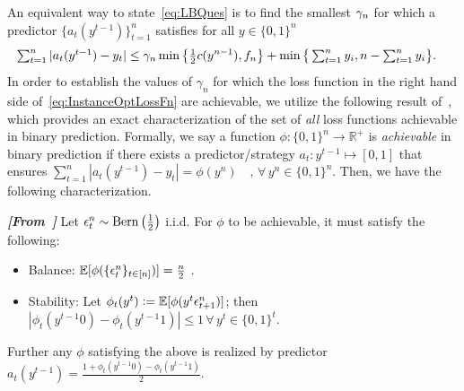 An equivalent way to state~\cref{eq:LBQues} is to find the smallest $\gamma_n$ for which a predictor $\{a_t(y^{t-1})\}_{t=1}^n$ satisfies for all $y\in\{0,1\}^n$
\begin{align}\label{eq:InstanceOptLossFn}
   \textstyle\sum_{t=1}^n |a_t(y^{t-1})-y_t| 
   &\le \gamma_n \min\big\{\tfrac12 c(y^{n-1}), f_n\big\} + \min\big\{\textstyle\sum_{t=1}^n y_i, n-\textstyle\sum_{t=1}^n y_i\big\}. 
\end{align}
In order to establish the values of $\gamma_n$ for which the loss function in the right hand side of~\cref{eq:InstanceOptLossFn} are achievable, we utilize the following result of~\cite{Cover1966}, which provides an exact characterization of the set of \emph{all} loss functions achievable in binary prediction. Formally, we say a function $\phi : \{0,1\}^n \to \mathbb{R}^+$ is \emph{achievable} in binary prediction if there exists a predictor/strategy $a_t: y^{t-1} \mapsto [0,1]$ that ensures $\sum_{t=1}^n |a_t(y^{t-1})-y_t| = \phi(y^n)\quad,\,\forall\,y^n\in\{0,1\}^n$. 
Then, we have the following characterization.

\begin{theorem}\emph{\bf[From~\cite{Cover1966}]}  
\label{thm:CoverAchievableFn}
Let $\epsilon_{t}^n \sim \mathrm{Bern}\left(\frac{1}{2}\right)$ i.i.d. For $\phi$ to be achievable, it must satisfy the following:
\begin{itemize}[nosep]
    \item Balance:  $\operatorname{\mathbb{E}}[\phi(\{\epsilon^n_t\}_{t\in[n]})] = \frac{n}{2}$ . 
    \item Stability: Let $\phi_t(y^t) \mathrel{\mathop{:}}= \operatorname{\mathbb{E}}[\phi(y^{t}\epsilon_{t+1}^n)]$; then $|\phi_t(y^{t-1}0)-\phi_t(y^{t-1}1)| \le 1\,\forall\,y^t\in\{0,1\}^t$. 
    \end{itemize}
    Further any $\phi$ satisfying the above is realized by predictor  $a_t(y^{t-1}) = \frac{1+\phi_t(y^{t-1}0)-\phi_t(y^{t-1}1)}{2}
    $.
\end{theorem}

